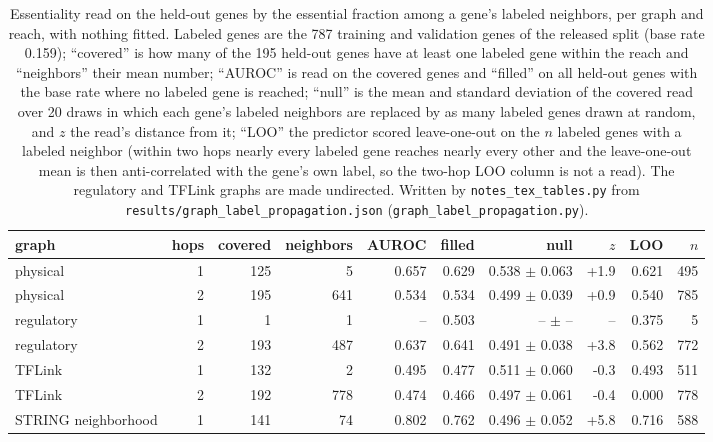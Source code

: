 \begin{table}[H]
  \centering
  \footnotesize
  \caption[Label propagation of essentiality on the graphs]{Essentiality read on the held-out genes by the essential fraction among a gene's labeled neighbors, per graph and reach, with nothing fitted. Labeled genes are the 787 training and validation genes of the released split (base rate 0.159); ``covered'' is how many of the 195 held-out genes have at least one labeled gene within the reach and ``neighbors'' their mean number; ``AUROC'' is read on the covered genes and ``filled'' on all held-out genes with the base rate where no labeled gene is reached; ``null'' is the mean and standard deviation of the covered read over 20 draws in which each gene's labeled neighbors are replaced by as many labeled genes drawn at random, and $z$ the read's distance from it; ``LOO'' the predictor scored leave-one-out on the $n$ labeled genes with a labeled neighbor (within two hops nearly every labeled gene reaches nearly every other and the leave-one-out mean is then anti-correlated with the gene's own label, so the two-hop LOO column is not a read). The regulatory and TFLink graphs are made undirected. Written by \texttt{notes\_tex\_tables.py} from \texttt{results/graph\_label\_propagation.json} (\texttt{graph\_label\_propagation.py}).}
  \label{tab:graph-label-propagation}
  \begin{tabular}{@{}lrrrrrrrrr@{}}
    \hline
    graph & hops & covered & neighbors & AUROC & filled & null & $z$ & LOO & $n$ \\
    \hline
    physical & 1 & 125 & 5 & 0.657 & 0.629 & 0.538 $\pm$ 0.063 & +1.9 & 0.621 & 495 \\
    physical & 2 & 195 & 641 & 0.534 & 0.534 & 0.499 $\pm$ 0.039 & +0.9 & 0.540 & 785 \\
    regulatory & 1 & 1 & 1 & -- & 0.503 & -- $\pm$ -- & -- & 0.375 & 5 \\
    regulatory & 2 & 193 & 487 & 0.637 & 0.641 & 0.491 $\pm$ 0.038 & +3.8 & 0.562 & 772 \\
    TFLink & 1 & 132 & 2 & 0.495 & 0.477 & 0.511 $\pm$ 0.060 & -0.3 & 0.493 & 511 \\
    TFLink & 2 & 192 & 778 & 0.474 & 0.466 & 0.497 $\pm$ 0.061 & -0.4 & 0.000 & 778 \\
    STRING neighborhood & 1 & 141 & 74 & 0.802 & 0.762 & 0.496 $\pm$ 0.052 & +5.8 & 0.716 & 588 \\

\end{tabular}
\end{table}
